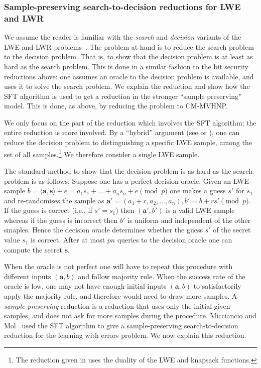 \documentclass[11pt]{article}
\theoremstyle{definition}
\begin{document}
\subsubsection{Sample-preserving search-to-decision reductions for LWE and LWR}

We assume the reader is familiar with the \emph{search} and \emph{decision} variants of the LWE and LWR problems~\cite{LWR,LWE}. The problem at hand is to reduce the search problem to the decision problem. That is, to show that the decision problem is at least as hard as the search problem. This is done in a similar fashion to the bit security reductions above: one assumes an oracle to the decision problem is available, and uses it to solve the search problem. We explain the reduction and show how the SFT algorithm is used to get a reduction in the stronger ``sample preserving'' model. This is done, as above, by reducing the problem to CM-MVHNP.

We only focus on the part of the reduction which involves the SFT algorithm; the entire reduction is more involved. By a ``hybrid'' argument (see \cite[Theorem 1]{HardCoreSurvey} or \cite[Lemma 3]{LWR_reduction}), one can reduce the decision problem to distinguishing a specific LWE sample, among the set of all samples.\footnote{The reduction given in \cite{MM} uses the duality of the LWE and knapsack functions.} We therefore consider a single LWE sample.

The standard method to show that the decision problem is as hard as the search problem is as follows. Suppose one has a perfect decision oracle. Given an LWE sample $b = \langle \textbf{a},\textbf{s} \rangle + e = a_1s_1 + \ldots + a_ns_n + e \pmod{p}$ one makes a guess $s'$ for $s_1$ and re-randomises the sample as $\textbf{a}' = ( a_1 + r, a_2, \dots, a_n), b' = b + rs' \pmod{p}$. If the guess is correct (i.e., if $s' = s_1$) then $( \textbf{a}', b')$ is a valid LWE sample whereas if the guess is incorrect then $b'$ is uniform and independent of the other smaples.
Hence the decision oracle determines whether the guess $s'$ of the secret value $s_1$ is correct.
After at most $pn$ queries to the decision oracle one can compute the secret $\textbf{s}$.

When the oracle is not perfect one will have to repeat this procedure with different inputs $(\textbf{a},b)$ and follow majority rule. When the success rate of the oracle is low, one may not have enough initial inputs $(\textbf{a},b)$ to satisfactorily apply the majority rule, and therefore would need to draw more samples. A \emph{sample-preserving} reduction is a reduction that uses only the initial given samples, and does not ask for more samples during the procedure. Micciancio and Mol~\cite{MM} used the SFT algorithm to give a sample-preserving search-to-decision reduction for the learning with errors problem. We now explain this reduction.
\end{document}
